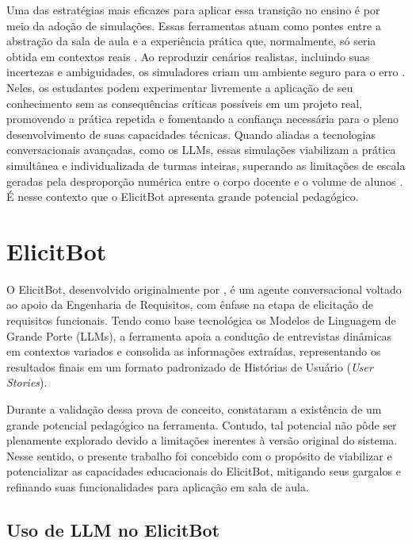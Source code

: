 Uma das estratégias mais eficazes para aplicar essa transição no ensino é por meio da adoção de simulações. Essas ferramentas atuam como pontes entre a abstração da sala de aula e a experiência prática que, normalmente, só seria obtida em contextos reais \cite{zhu2016}. Ao reproduzir cenários realistas, incluindo suas incertezas e ambiguidades, os simuladores criam um ambiente seguro para o erro \cite{ataei2024}. Neles, os estudantes podem experimentar livremente a aplicação de seu conhecimento sem as consequências críticas possíveis em um projeto real, promovendo a prática repetida e fomentando a confiança necessária para o pleno desenvolvimento de suas capacidades técnicas. Quando aliadas a tecnologias conversacionais avançadas, como os LLMs, essas simulações viabilizam a prática simultânea e individualizada de turmas inteiras, superando as limitações de escala geradas pela desproporção numérica entre o corpo docente e o volume de alunos \cite{essel2022, soliman2025}. É nesse contexto que o ElicitBot \cite{junior2025} apresenta grande potencial pedagógico.

\section{ElicitBot}
\label{sec:elicitbot}

O ElicitBot, desenvolvido originalmente por , é um agente conversacional voltado ao apoio da Engenharia de Requisitos, com ênfase na etapa de elicitação de requisitos funcionais. Tendo como base tecnológica os Modelos de Linguagem de Grande Porte (LLMs), a ferramenta apoia a condução de entrevistas dinâmicas em contextos variados e consolida as informações extraídas, representando os resultados finais em um formato padronizado de Histórias de Usuário (\textit{User Stories}).

Durante a validação dessa prova de conceito,  constataram a existência de um grande potencial pedagógico na ferramenta. Contudo, tal potencial não pôde ser plenamente explorado devido a limitações inerentes à versão original do sistema. Nesse sentido, o presente trabalho foi concebido com o propósito de viabilizar e potencializar as capacidades educacionais do ElicitBot, mitigando seus gargalos e refinando suas funcionalidades para aplicação em sala de aula.

\subsection{Uso de LLM no ElicitBot}


